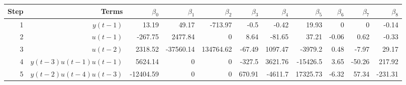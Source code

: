 \begin{tabular}{rrrrrrrrrrr}
Step & Terms & $\beta_{0}$ & $\beta_{1}$ & $\beta_{2}$ & $\beta_{3}$ & $\beta_{4}$ & $\beta_{5}$ & $\beta_{6}$ & $\beta_{7}$ & $\beta_{8}$ \\ 
\hline 
1 & $y(t-1)$ & 13.19 & 49.17 & -713.97 & -0.5 & -0.42 & 19.93 & 0 & 0 & -0.14 \\ 
2 & $u(t-1)$ & -267.75 & 2477.84 & 0 & 8.64 & -81.65 & 37.21 & -0.06 & 0.62 & -0.33 \\ 
3 & $u(t-2)$ & 2318.52 & -37560.14 & 134764.62 & -67.49 & 1097.47 & -3979.2 & 0.48 & -7.97 & 29.17 \\ 
4 & $y(t-3)u(t-1)u(t-1)$ & 5624.14 & 0 & 0 & -327.5 & 3621.76 & -15426.5 & 3.65 & -50.26 & 217.92 \\ 
5 & $y(t-2)u(t-4)u(t-3)$ & -12404.59 & 0 & 0 & 670.91 & -4611.7 & 17325.73 & -6.32 & 57.34 & -231.31 \\ 
\hline 
\end{tabular}
